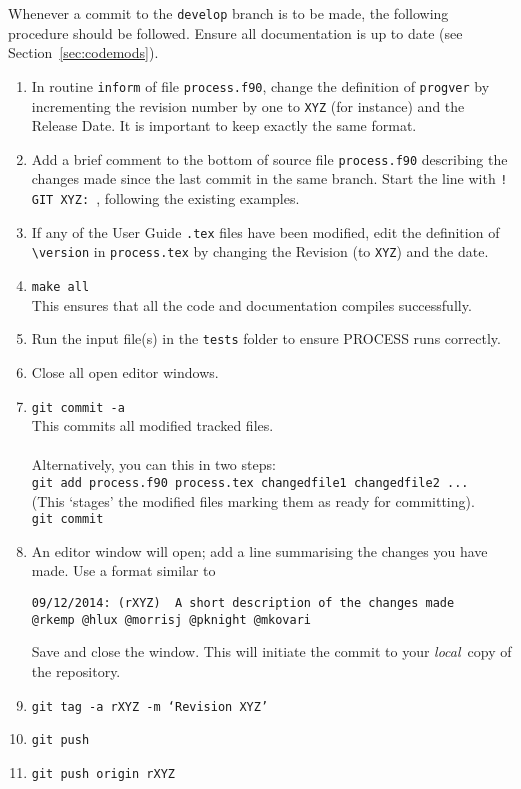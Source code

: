 Whenever a commit to the \texttt{develop} branch is to be made, the following
procedure should be followed. Ensure all documentation is up to date (see
Section~\ref{sec:codemods}).
\begin{enumerate}

\item In routine \texttt{inform} of file \texttt{process.f90}, change the
  definition of \texttt{progver} by incrementing the revision number by one to
  \texttt{XYZ} (for instance) and the Release Date. It is important to keep
  exactly the same format.

\item Add a brief comment to the bottom of source file \texttt{process.f90}
  describing the changes made since the last commit in the same branch. Start
  the line with \texttt{! GIT XYZ: }, following the existing examples.

\item If any of the User Guide \texttt{.tex} files have been modified, edit
  the definition of \verb+\version+ in \texttt{process.tex} by changing the
  Revision (to \texttt{XYZ}) and the date.
  
\item \texttt{make all} \\
This ensures that all the code and documentation compiles successfully.  

\item Run the input file(s) in the \texttt{tests} folder to ensure PROCESS runs correctly.

\item 
Close all open editor windows.

\item   \texttt{git commit -a} \\
  This commits all modified tracked files.\\
  \\
  Alternatively, you can this in two steps:\\  
  \texttt{git add process.f90 process.tex changedfile1 changedfile2 ...}  \\
  (This `stages' the modified files marking them as ready for committing).  \\
  \texttt{git commit}  

\item An editor window will open; add a line summarising the changes you have made.  Use a format similar to
\begin{verbatim}
09/12/2014: (rXYZ)  A short description of the changes made
@rkemp @hlux @morrisj @pknight @mkovari
\end{verbatim}
Save and close the window. This will initiate the commit to your \textit{local}\ copy of the repository.  

\item \texttt{git tag -a rXYZ -m `Revision XYZ'}

\item \texttt{git push}

\item \texttt{git push origin rXYZ}

\end{enumerate}

